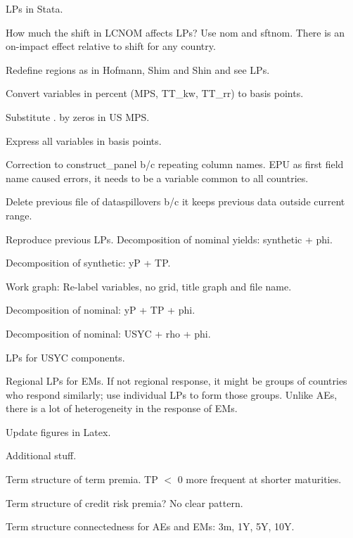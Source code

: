 \documentclass[12pt]{article}
\newcommand{\cmark}{\ding{51}}
\newcommand{\done}{\rlap{$\square$}{\raisebox{2pt}{\large\hspace{1pt}\cmark}}%
	\hspace{-2.5pt}}
\begin{document}
\begin{todolist}
	\item LPs in Stata.
	\begin{todolist}
		\item[\done] How much the shift in LCNOM affects LPs? Use nom and sftnom. There is an on-impact effect relative to shift for any country.
		\item[\done] Redefine regions as in Hofmann, Shim and Shin and see LPs.
		\item[\done] Convert variables in percent (MPS, TT_kw, TT_rr) to basis points.
		\item[\done] Substitute . by zeros in US MPS.
		\item[\done] Express all variables in basis points.
		\item[\done] Correction to construct_panel b/c repeating column names. EPU as first field name caused errors, it needs to be a variable common to all countries.
		\item[\done] Delete previous file of dataspillovers b/c it keeps previous data outside current range.
		\item[\done] Reproduce previous LPs. Decomposition of nominal yields: synthetic + phi.
		\item[\done] Decomposition of synthetic: yP + TP.
		\item[\done] Work graph: Re-label variables, no grid, title graph and file name.
		\item[\done] Decomposition of nominal: yP + TP + phi.
		\item[\done] Decomposition of nominal: USYC + rho + phi.
		\item LPs for USYC components.
		\item Regional LPs for EMs. If not regional response, it might be groups of countries who respond similarly; use individual LPs to form those groups. Unlike AEs, there is a lot of heterogeneity in the response of EMs.
		\item Update figures in Latex.
	\end{todolist}
	\item Additional stuff.
	\begin{todolist}
		\item[\done] Term structure of term premia. TP \(<\) 0 more frequent at shorter maturities.
		\item[\done] Term structure of credit risk premia? No clear pattern.
		\item Term structure connectedness for AEs and EMs: 3m, 1Y, 5Y, 10Y.

\end{todolist}
\end{todolist}
\end{document}

